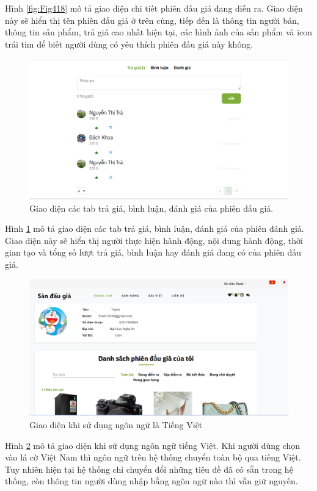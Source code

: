 \documentclass[../DoAn.tex]{subfiles}
\begin{document}
Hình \ref{fig:Fig418} mô tả giao diện chi tiết phiên đấu giá đang diễn ra. Giao diện này sẽ hiển thị tên phiên đấu giá ở trên cùng, tiếp đến là thông tin người bán, thông tin sản phẩm, trả giá cao nhất hiện tại, các hình ảnh của sản phẩm và icon trái tim để biết người dùng có yêu thích phiên đấu giá này không.
\begin{figure}[H]
    \centering
    \includegraphics[width=0.75\linewidth,height=6.1cm]{Hinhve/commentbid.png}
    \caption{Giao diện các tab trả giá, bình luận, đánh giá của phiên đấu giá.}
    \label{fig:Fig419}
\end{figure}
Hình \ref{fig:Fig419} mô tả giao diện các tab trả giá, bình luận, đánh giá của phiên đánh giá. Giao diện này sẽ hiển thị người thực hiện hành động, nội dung hành động, thời gian tạo và tổng số lượt trả giá, bình luận hay đánh giá đang có của phiên đấu giá. 
\begin{figure}[H]
    \centering
    \includegraphics[width=0.75\linewidth,height=5.95cm]{Hinhve/vietnamese.png}
    \caption{Giao diện khi sử dụng ngôn ngữ là Tiếng Việt}
    \label{fig:Fig420}
\end{figure}
Hình \ref{fig:Fig420} mô tả giao diện khi sử dụng ngôn ngữ tiếng Việt. Khi người dùng chọn vào lá cờ Việt Nam thì ngôn ngữ trên hệ thống chuyển toàn bộ qua tiếng Việt. Tuy nhiên hiện tại hệ thống chỉ chuyển đổi những tiêu đề đã có sẵn trong hệ thống, còn thông tin người dùng nhập bằng ngôn ngữ nào thì vẫn giữ nguyên.
\end{document}
